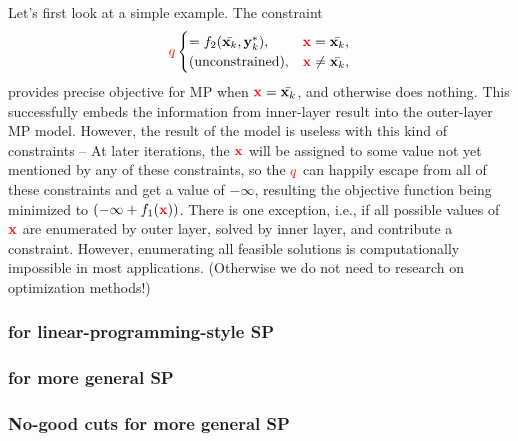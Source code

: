 \documentclass[twocolumn]{ctexart}
\begin{document}
Let's first look at a simple example.
The constraint
\begin{equation}
    \begin{aligned}
        {\color{red} q}
        \begin{cases}
            = f_2(  \bar{\mathbf{x}_k}  ,  \mathbf{y}^*_k  ),  &  \mathbf{\color{red} x} =    \bar{\mathbf{x}_k}, \\
            \text{(unconstrained)}                         ,  &  \mathbf{\color{red} x} \neq \bar{\mathbf{x}_k}, \\
        \end{cases}
    \end{aligned}
\end{equation}
provides precise objective for MP when $\mathbf{\color{red} x} = \bar{\mathbf{x}_k}$, and otherwise does nothing.
%
%
This successfully embeds the information from inner-layer result into the outer-layer MP model.
However, the result of the model is useless with this kind of constraints --
At later iterations, the $\mathbf{\color{red} x}$ will be assigned to some value not yet mentioned by any of these constraints,
so the ${\color{red} q}$ can happily escape from all of these constraints and get a value of $-\infty$,
resulting the objective function being minimized to $( - \infty + f_1(  \mathbf{\color{red} x}  ) )$.
There is one exception, i.e., if all possible values of $\mathbf{\color{red} x}$ are enumerated by outer layer, solved by inner layer, and contribute a constraint.
However, enumerating all feasible solutions is computationally impossible in most applications. (Otherwise we do not need to research on optimization methods!)


\subsubsection{for linear-programming-style SP}


\subsubsection{for more general SP}


\subsubsection{No-good cuts for more general SP}


\begin{equation}
    \begin{aligned}
    \end{aligned}
\end{equation}





\clearpage

% 

\printbibliography
\end{document}
